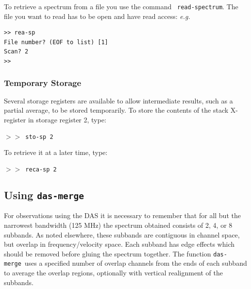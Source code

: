\documentclass[11pt,twoside]{article}
\newcommand{\eg}{{\it e.g.}}
\newcommand{\dm}{{\tt das-merge}}
\newcommand{\SP}{{$>\!>$}}
\begin{document}
To retrieve a spectrum from a file you use the command {\tt
read-spectrum}.  The file you want to read has to be open and have
read access: \eg

\begin{verbatim}
>> rea-sp
File number? (EOF to list) [1] 
Scan? 2
>> 
\end{verbatim}

\subsubsection{Temporary Storage}
\label{sec:temp-storage}
Several storage registers are available to allow intermediate results,
such as a partial average, to be stored temporarily. To store the
contents of the stack X-register in storage register 2, type:

\SP\ {\tt sto-sp 2}

To retrieve it at a later time, type:

\SP\ {\tt reca-sp 2}


\subsection{Using {\tt das-merge}}
\label{sec:das-merge}
For observations using the DAS it is necessary to remember that for
all but the narrowest bandwidth (125 MHz) the spectrum obtained
consists of 2, 4, or 8 subbands. As noted elsewhere, these subbands
are contiguous in channel space, but overlap in frequency/velocity
space. Each subband has edge effects which should be removed before
gluing the spectrum together. The function \dm\ uses a specified
number of overlap channels from the ends of each subband to average
the overlap regions, optionally with vertical realignment of the
subbands.
\end{document}

